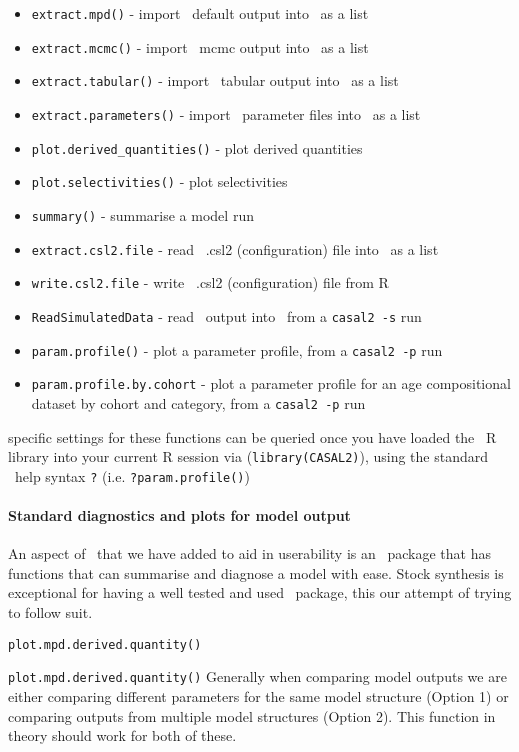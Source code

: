 \begin{itemize}
	\item \texttt{extract.mpd()} - import \CNAME\ default output into \R\ as a list
	\item \texttt{extract.mcmc()} - import \CNAME\ mcmc output into \R\ as a list
	\item \texttt{extract.tabular()} - import \CNAME\ tabular output into \R\ as a list
	\item \texttt{extract.parameters()} - import \CNAME\ parameter files into \R\ as a list
	\item \texttt{plot.derived\_quantities()} - plot derived quantities
	\item \texttt{plot.selectivities()} - plot selectivities
	\item \texttt{summary()} - summarise a model run	
	\item \texttt{extract.csl2.file} - read \CNAME\ .csl2 (configuration) file into \R\ as a list
	\item \texttt{write.csl2.file} - write \CNAME\ .csl2 (configuration) file from R
	\item \texttt{ReadSimulatedData} - read \CNAME\ output into \R\ from a \texttt{casal2 -s} run		
	\item \texttt{param.profile()} - plot a parameter profile, from a \texttt{casal2 -p} run
	\item \texttt{param.profile.by.cohort} - plot a parameter profile for an age compositional dataset by cohort and category, from a \texttt{casal2 -p} run
	
\end{itemize}

specific settings for these functions can be queried once you have loaded the \CNAME\ R library into your current R session via (\texttt{library(CASAL2)}), using the standard \R\ help syntax \texttt{?} (i.e. \texttt{?param.profile()})
\\
\paragraph*{Standard diagnostics and plots for model output}
An aspect of \CNAME\ that we have added to aid in userability is an \R\ package that has functions that can summarise and diagnose a model with ease. Stock synthesis is exceptional for having a well tested and used \R\ package, this our attempt of trying to follow suit.

\texttt{plot.mpd.derived.quantity()}

\texttt{plot.mpd.derived.quantity()}
Generally when comparing model outputs we are either comparing different parameters for the same model structure (Option 1) or comparing outputs from multiple model structures (Option 2). This function in theory should work for both of these.

